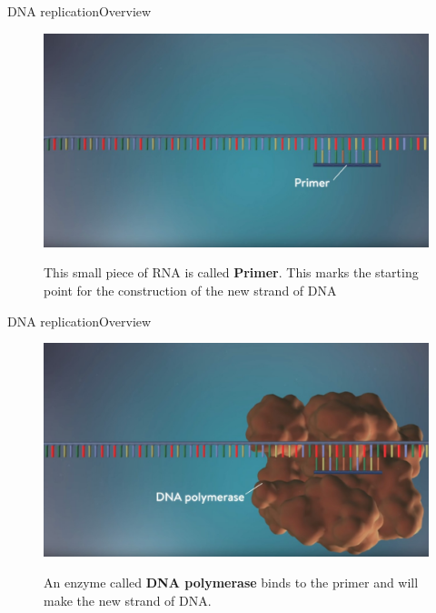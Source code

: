 \documentclass[10pt]{beamer}
\begin{document}
{%
\begin{frame}{DNA replication}{Overview}
	\begin{figure}[]
		\centering
		\includegraphics[width=\textwidth,height=0.6\textheight,keepaspectratio]{img/introduction/dna35.jpg}
		\label{img:mot2}
		\caption{This small piece of RNA is called \textbf{Primer}. This marks the starting point for the construction of the new strand of DNA}
	\end{figure}
\end{frame}

\begin{frame}{DNA replication}{Overview}
	\begin{figure}[]
		\centering
		\includegraphics[width=\textwidth,height=0.6\textheight,keepaspectratio]{img/introduction/dna36.jpg}
		\label{img:mot2}
		\caption{An enzyme called \textbf{DNA polymerase} binds to the primer and will make the new strand of DNA.}
	\end{figure}
\end{frame}



}
\end{document}
